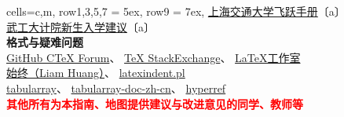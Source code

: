 \begin{table}[H]
\begin{tblr}[
            tall,
            theme = {no-caption},
            note{1} = {符号含义：\newline〔a〕:已获编委（主编）授权；〔b〕：已询问，暂未答复；〔c〕：未能联系到作者。},
        ]{
            cells={c,m},
            row{1,3,5,7} = {5ex},
            row{9} = {7ex},
        }
{        \href{https://github.com/SurviveSJTU/SJTU-Application}{%
        上海交通大学飞跃手册}〔a〕                                                        \\
        \href{https://gitee.com/hanyaner/WITjsj}{%
        武工大计院新生入学建议}〔a〕}                                                     \\
        {\large\textbf{格式与疑难问题}}                                                   \\
        {
        {\href{https://github.com/CTeX-org/forum/issues}{GitHub CTeX Forum}、%
                \href{https://tex.stackexchange.com}{TeX StackExchange}、%
        \href{https://www.latexstudio.net}{LaTeX工作室}}                                  \\
        {\href{https://liam.page}{始终（Liam Huang）}、%
        \href{https://ctan.org/pkg/latexindent}{latexindent.pl}}                          \\
        {\href{https://github.com/lvjr/tabularray}{tabularray}、%
        \href{https://gitee.com/nwafu_nan/tabularray-doc-zh-cn}{tabularray-doc-zh-cn}、%
        \href{https://github.com/latex3/hyperref}{hyperref}}
        }                                                                                 \\
        {\large\textbf{\textcolor{red}{其他所有为本指南、地图提供建议与改进意见的同学、教师等}}}
    \end{tblr}


\end{table}
